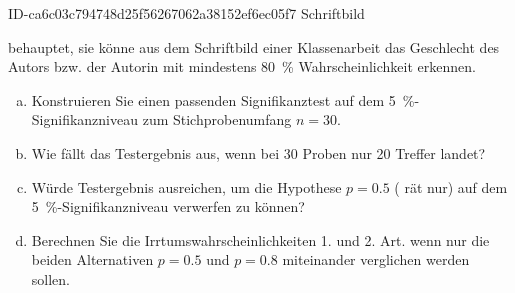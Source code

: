 \begin{exercise}
      {ID-ca6c03c794748d25f56267062a38152ef6ec05f7}
      {Schriftbild}
  \ifproblem\problem\par
    \xxa{} behauptet, sie könne aus dem Schriftbild
    einer Klassenarbeit das Geschlecht des Autors
    bzw. der Autorin mit mindestens \SI{80}{\percent}
    Wahrscheinlichkeit erkennen.
    \begin{enumerate}[a)]
      \item Konstruieren Sie einen passenden Signifikanztest
            auf dem \SI{5}{\percent}-Signifikanzniveau zum
            Stichprobenumfang $n=30$.
      \item Wie fällt das Testergebnis aus, wenn \xxa{}
            bei \num{30} Proben nur \num{20} Treffer landet?
      \item Würde \xxas{} Testergebnis ausreichen, um
            die Hypothese $p=\num{0.5}$ (\xxa{} rät nur)
            auf dem \SI{5}{\percent}-Signifikanzniveau
            verwerfen zu können?
      \item Berechnen Sie die Irrtumswahrscheinlichkeiten
            1. und 2. Art. wenn nur die beiden Alternativen
            $p=\num{0.5}$ und $p=\num{0.8}$ miteinander
            verglichen werden sollen.
    \end{enumerate}
  \fi
\end{exercise}
